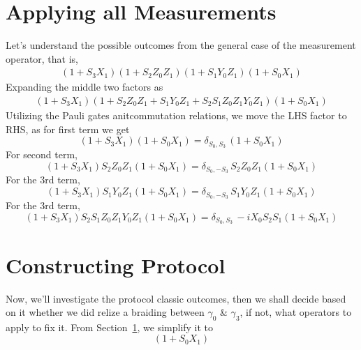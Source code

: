 \documentclass{article}
\begin{document}
\section{Applying all Measurements} %
\label{sec:Applying all Measurements}
Let's understand the possible outcomes from the general case of the measurement operator,
that is,
\begin{align}
	(1 +S_3 X_1) (1 +S_2 Z_0 Z_1) (1 +S_1 Y_0 Z_1) (1 +S_0 X_1)
	\label{eq:general meas}
\end{align}
Expanding the middle two factors as
\begin{align}
	(1 +S_3 X_1) (1 + S_2 Z_0 Z_1 + S_1 Y_0 Z_1 + S_2 S_1 Z_0 Z_1 Y_0 Z_1) (1 +S_0 X_1)
	\label{eq:expanding}
\end{align}
Utilizing the Pauli gates anitcommutation relations, we move the LHS factor to RHS,
as for first term we get
\begin{equation*}
	(1 +S_3 X_1) (1 +S_0 X_1) = \delta_{S_0,S_3}\, (1 +S_0 X_1)
\end{equation*}
For second term,
\begin{equation*}
	(1 +S_3 X_1) S_2 Z_0 Z_1 (1 +S_0 X_1) = \delta_{S_0,-S_3}\, S_2 Z_0 Z_1 (1 +S_0 X_1)
\end{equation*}
For the 3rd term,
\begin{equation*}
	(1 +S_3 X_1) S_1 Y_0 Z_1 (1 +S_0 X_1) = \delta_{S_0,-S_3}\, S_1 Y_0 Z_1 (1 +S_0 X_1)
\end{equation*}
For the 3rd term,
\begin{equation*}
	(1 +S_3 X_1) S_2 S_1 Z_0 Z_1 Y_0 Z_1 (1 +S_0 X_1) = \delta_{S_0,S_3}\, -i X_0 S_2 S_1 (1 +S_0 X_1)
\end{equation*}

\section{Constructing Protocol} %
\label{sec:Constructing Protocol}
Now, we'll investigate the protocol classic outcomes, then we shall decide based on it whether
we did relize a braiding between $ \gamma_0 $ \& $ \gamma_3 $, if not, what operators
to apply to fix it. From Section~\ref{sec:Applying all Measurements}, we simplify it to
\begin{equation*}
	[
		\delta_{S_0,S_3} + \delta_{S_0,-S_3}\, S_2 Z_0 Z_1
		+ \delta_{S_0,-S_3}\, S_1 Y_0 Z_1 + \delta_{S_0,S_3}\, -i X_0 S_2 S_1
	] (1 +S_0 X_1)
\end{equation*}
\end{document}
